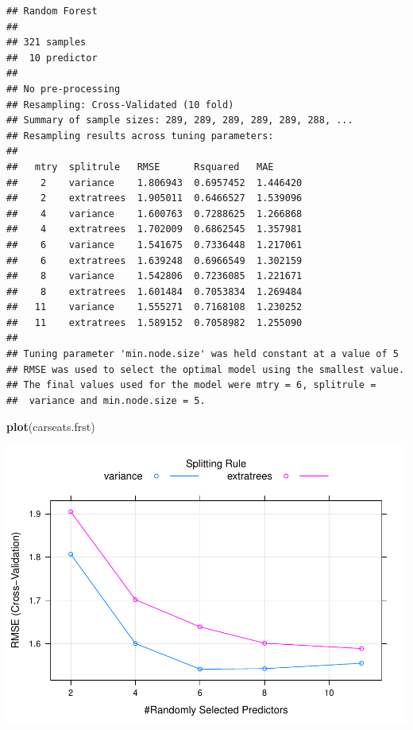 \documentclass[]{book}
\newenvironment{Shaded}{\begin{snugshade}}{\end{snugshade}}
\newcommand{\DataTypeTok}[1]{\textcolor[rgb]{0.13,0.29,0.53}{#1}}
\newcommand{\DecValTok}[1]{\textcolor[rgb]{0.00,0.00,0.81}{#1}}
\newcommand{\KeywordTok}[1]{\textcolor[rgb]{0.13,0.29,0.53}{\textbf{#1}}}
\newcommand{\NormalTok}[1]{#1}
\newcommand{\OperatorTok}[1]{\textcolor[rgb]{0.81,0.36,0.00}{\textbf{#1}}}
\newcommand{\StringTok}[1]{\textcolor[rgb]{0.31,0.60,0.02}{#1}}
\begin{document}
\begin{verbatim}
## Random Forest 
## 
## 321 samples
##  10 predictor
## 
## No pre-processing
## Resampling: Cross-Validated (10 fold) 
## Summary of sample sizes: 289, 289, 289, 289, 289, 288, ... 
## Resampling results across tuning parameters:
## 
##   mtry  splitrule   RMSE      Rsquared   MAE     
##    2    variance    1.806943  0.6957452  1.446420
##    2    extratrees  1.905011  0.6466527  1.539096
##    4    variance    1.600763  0.7288625  1.266868
##    4    extratrees  1.702009  0.6862545  1.357981
##    6    variance    1.541675  0.7336448  1.217061
##    6    extratrees  1.639248  0.6966549  1.302159
##    8    variance    1.542806  0.7236085  1.221671
##    8    extratrees  1.601484  0.7053834  1.269484
##   11    variance    1.555271  0.7168108  1.230252
##   11    extratrees  1.589152  0.7058982  1.255090
## 
## Tuning parameter 'min.node.size' was held constant at a value of 5
## RMSE was used to select the optimal model using the smallest value.
## The final values used for the model were mtry = 6, splitrule =
##  variance and min.node.size = 5.
\end{verbatim}

\begin{Shaded}
\begin{Highlighting}[]
\KeywordTok{plot}\NormalTok{(carseats.frst)}
\end{Highlighting}
\end{Shaded}

\includegraphics{data-sci_files/figure-latex/unnamed-chunk-84-1.pdf}

\begin{Shaded}
\end{Shaded}
\end{document}
